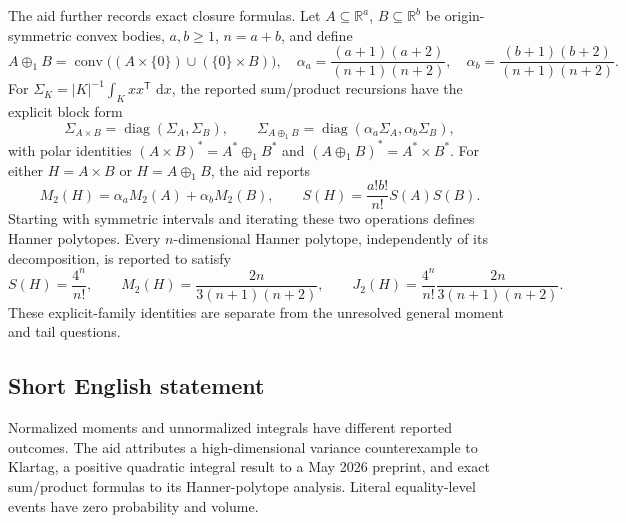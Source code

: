 \documentclass[11pt]{article}
\newcommand{\R}{\mathbb{R}}
\newcommand{\dd}{\,\mathrm{d}}
\begin{document}
The aid further records exact closure formulas. Let \(A\subseteq\R^a\), \(B\subseteq\R^b\) be origin-symmetric convex bodies, \(a,b\geq1\), \(n=a+b\), and define
\[
 A\oplus_1B=\operatorname{conv}\bigl((A\times\{0\})\cup(\{0\}\times B)\bigr),\quad
 \alpha_a=\frac{(a+1)(a+2)}{(n+1)(n+2)},\quad
 \alpha_b=\frac{(b+1)(b+2)}{(n+1)(n+2)}.
\]
For \(\Sigma_K=|K|^{-1}\int_Kxx^{\mathsf T}\,\dd x\), the reported sum/product recursions have the explicit block form
\[
 \Sigma_{A\times B}=\operatorname{diag}(\Sigma_A,\Sigma_B),\qquad
 \Sigma_{A\oplus_1B}=\operatorname{diag}(\alpha_a\Sigma_A,\alpha_b\Sigma_B),
\]
with polar identities \((A\times B)^*=A^*\oplus_1B^*\) and \((A\oplus_1B)^*=A^*\times B^*\). For either \(H=A\times B\) or \(H=A\oplus_1B\), the aid reports
\[
 M_2(H)=\alpha_aM_2(A)+\alpha_bM_2(B),\qquad
 S(H)=\frac{a!b!}{n!}S(A)S(B).
\]
Starting with symmetric intervals and iterating these two operations defines Hanner polytopes. Every \(n\)-dimensional Hanner polytope, independently of its decomposition, is reported to satisfy
\[
 S(H)=\frac{4^n}{n!},\qquad
 M_2(H)=\frac{2n}{3(n+1)(n+2)},\qquad
 J_2(H)=\frac{4^n}{n!}\frac{2n}{3(n+1)(n+2)}.
\]
These explicit-family identities are separate from the unresolved general moment and tail questions.
\subsection{Short English statement}
Normalized moments and unnormalized integrals have different reported outcomes. The aid attributes a high-dimensional variance counterexample to Klartag, a positive quadratic integral result to a May 2026 preprint, and exact sum/product formulas to its Hanner-polytope analysis. Literal equality-level events have zero probability and volume.
\end{document}
